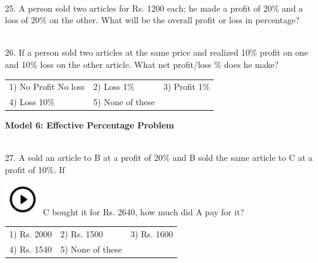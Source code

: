 \documentclass{article}
\begin{document}
	
	
	\noindent  \\ 	25. A person sold two articles for Rs. 1200 each; he made a profit of 20\% and a loss of 20\% on the  other. What will be the overall profit or loss in percentage?
	
	\noindent 
	
	\noindent 
	
	\noindent 
	
	\noindent 
	
	\noindent 
	
	\noindent  \\ 26. If a person sold two articles at the same price and realized 10\% profit on one and 10\% loss on the other article. What net profit/loss \% does he make?
	
	\noindent 
	
	\begin{tabular}{p{1.9in} p{1.5in} p{0.9in}|}  

 1) No Profit No loss & 2) Loss 1\% & 3) Profit 1\% \\  
		
4) Loss 10\% & 5) None of these &  \\  
	\end{tabular}
	
	
	
	\noindent 
	
	\noindent 
	
	\noindent \textbf{Model 6: Effective Percentage Problem}
	
	\noindent 
	
	\noindent \\  27. A sold an article to B at a profit of 20\% and B sold the same article to C at a profit of 10\%. If
	
	\noindent \includegraphics*[width=0.60in, height=0.52in]{images/image1} C bought it for Rs. 2640, how much did A pay for it?
	
	\noindent \begin{tabular}{p{1.7in} p{1.6in} p{1.6in}} \\ 
 1) Rs. 2000                 & 2) Rs. 1500          & 3) Rs. 1600          \\
4) Rs. 1540          & 5) None of these \\
\end{tabular}
	
\end{document}
